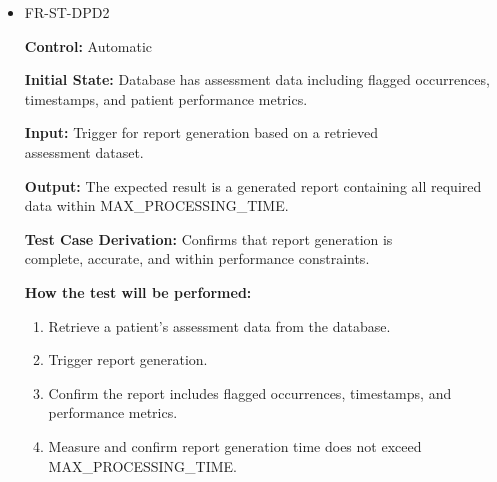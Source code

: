 \documentclass[12pt, titlepage]{article}
\begin{document}
\begin{itemize}
  \item FR-ST-DPD2
  \begin{mdframed}[linewidth=0.5mm]
      \textbf{Control:} Automatic \par
      \textbf{Initial State:} Database has assessment data including flagged occurrences,\\
      timestamps, and patient performance metrics. \par
      \textbf{Input:} Trigger for report generation based on a retrieved \\assessment dataset. \par
      \textbf{Output:} The expected result is a generated report containing all required data within MAX\_PROCESSING\_TIME. \par
      \textbf{Test Case Derivation:} Confirms that report generation is \\complete, accurate, and within performance constraints. \par
      \textbf{How the test will be performed:}
      \begin{enumerate}[noitemsep]
        \item Retrieve a patient’s assessment data from the database. 
        \item Trigger report generation. 
        \item Confirm the report includes flagged occurrences, timestamps, and performance metrics. 
        \item Measure and confirm report generation time does not exceed\\ MAX\_PROCESSING\_TIME.
      \end{enumerate}
  \end{mdframed}


\end{itemize}
\end{document}
